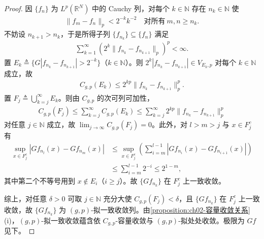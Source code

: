 \documentclass[../../main.tex]{subfiles}%
\begin{document}
\begin{proof}
因 $\{f_n\}$ 为 $L^p(\mathbb{R}^N)$ 中的 Cauchy 列，对每个 $k\in\mathbb{N}$ 存在 $n_k\in\mathbb{N}$ 使
\begin{align*}
\|f_m-f_n\|_p<2^{-k}k^{-2}\quad\text{对所有}\ m,n\geqslant n_k.
\end{align*}
不妨设 $n_{k+1}>n_k$，于是所得子列 $\{f_{n_k}\}\subseteq\{f_n\}$ 满足
\begin{align*}
\sum_{k=1}^\infty\left(2^k\|f_{n_k}-f_{n_{k+1}}\|_p\right)^p<\infty.
\end{align*}
置 $E_k\triangleq\{G|f_{n_k}-f_{n_{k+1}}|>2^{-k}\}$（$k\in\mathbb{N}$）。则 $2^k|f_{n_k}-f_{n_{k+1}}|\in V_{E_k,p}$ 对每个 $k\in\mathbb{N}$ 成立，故
\begin{align*}
C_{g,p}(E_k)\leqslant2^{kp}\|f_{n_k}-f_{n_{k+1}}\|_p^p .
\end{align*}
置 $F_j\triangleq\bigcup_{k=j}^\infty E_k$。则由 $C_{g,p}$ 的次可列可加性，
\begin{align*}
C_{g,p}(F_j)\leqslant\sum_{k=j}^\infty C_{g,p}(E_k)\leqslant\sum_{k=j}^\infty2^{kp}\|f_{n_k}-f_{n_{k+1}}\|_p^p
\end{align*}
对任意 $j\in\mathbb{N}$ 成立，故 $\lim_{j\to\infty}C_{g,p}(F_j)=0$。此外，对 $l>m>j$ 与 $x\in F_j^c$ 有
\begin{align*}
\sup_{x\in F_j^c}\left|Gf_{n_l}(x)-Gf_{n_m}(x)\right|
&\leqslant\sup_{x\in F_j^c}\left(\sum_{i=m}^{l-1}\left|Gf_{n_i}(x)-Gf_{n_{i+1}}(x)\right|\right)\\
&\leqslant\sum_{i=m}^{l-1}2^{-i}\leqslant2^{1-m},
\end{align*}
其中第二个不等号用到 $x\notin E_i$（$i\geqslant j$）。故 $\{Gf_{n_k}\}$ 在 $F_j^c$ 上一致收敛。

综上，对任意 $\delta>0$ 可取 $j\in\mathbb{N}$ 充分大使 $C_{g,p}(F_j)<\delta$，且 $\{Gf_{n_k}\}$ 在 $F_j^c$ 上一致收敛，故 $\{Gf_{n_k}\}$ 为 $(g,p)$-拟一致收敛列。由\cref{proposition:ch02-容量收敛关系}(i)，$(g,p)$-拟一致收敛蕴含依 $C_{g,p}$-容量收敛与 $(g,p)$-拟处处收敛。极限为 $Gf$ 见下。
\end{proof}
\end{document}

